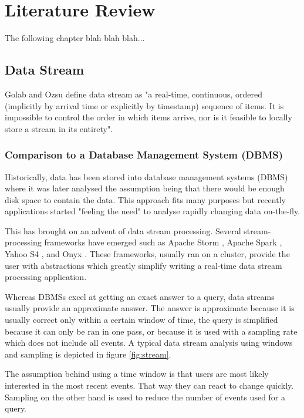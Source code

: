 \chapter{Literature Review}

The following chapter blah blah blah...

\section{Data Stream}

Golab and Ozsu define data stream as "a real-time, continuous, ordered (implicitly by arrival time or explicitly by timestamp) sequence of items. It is impossible to control the order in which items arrive, nor is it feasible to locally store a stream in its entirety". \cite{golab2003issues}

\subsection{Comparison to a Database Management System (DBMS)}

Historically, data has been stored into database management systems (DBMS) where it was later analysed the assumption being that there would be enough disk space to contain the data. This approach fits many purposes but recently applications started "feeling the need" to analyse rapidly changing data on-the-fly.

This has brought on an advent of data stream processing. Several stream-processing frameworks have emerged such as Apache Storm \cite{ApacheStorm}, Apache Spark \cite{ApacheSpark}, Yahoo S4 \cite{YahooS4}, and Onyx \cite{Onyx}. These frameworks, usually ran on a cluster, provide the user with abstractions which greatly simplify writing a real-time data stream processing application.

Whereas DBMSs excel at getting an exact answer to a query, data streams usually provide an approximate answer. The answer is approximate because it is usually correct only within a certain window of time, the query is simplified because it can only be ran in one pass, or because it is used with a sampling rate which does not include all events. A typical data stream analysis using windows and sampling is depicted in figure \ref{fig:stream}.

The assumption behind using a time window is that users are most likely interested in the most recent events. That way they can  react to change quickly. Sampling on the other hand is used to reduce the number of events used for a query. \cite{Gaber:2005:MDS:1083784.1083789}

